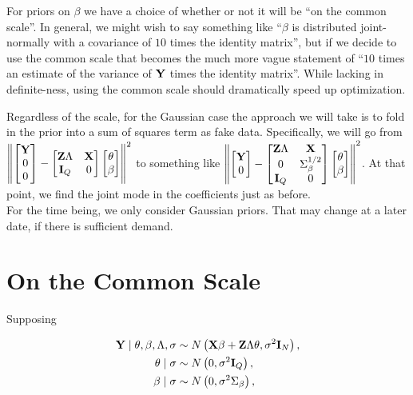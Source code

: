 \documentclass[10pt]{article}
\begin{document}
For priors on $\beta$ we have a choice of whether or not it will be
``on the common scale''. In general, we might wish to say something
like ``$\beta$ is distributed joint-normally with a covariance of $10$
times the identity matrix'', but if we decide to use the common scale
that becomes the much more vague statement of ``$10$ times an estimate
of the variance of ${\bf Y}$ times the identity matrix''. While
lacking in definite-ness, using the common scale should dramatically
speed up optimization.

Regardless of the scale, for the Gaussian case the approach we will take
is to fold in the prior into a sum of squares term as fake
data. Specifically, we will go from
$\left\| \begin{bmatrix}{\bf Y} \\ 0 \\ 0\end{bmatrix}
-\begin{bmatrix} {\bf Z}\Lambda & {\bf X} \\ {\bf I}_Q &
  0\end{bmatrix} \begin{bmatrix}\theta \\ \beta\end{bmatrix}
\right\|^2$ to something like 
$\left\| \begin{bmatrix}{\bf Y} \\ 0\end{bmatrix}
-\begin{bmatrix} {\bf Z}\Lambda & {\bf X} \\ 0 & \Sigma_\beta^{1/2} \\
  {\bf I}_Q &
  0\end{bmatrix} \begin{bmatrix}\theta \\ \beta\end{bmatrix}
\right\|^2$. At that point, we find the joint mode in the coefficients
just as before. \\

For the time being, we only consider Gaussian priors. That may change
at a later date, if there is sufficient demand.

\section*{On the Common Scale}

Supposing

\begin{align*}
{\bf Y} \mid \theta, \beta, \Lambda, \sigma &
\sim
N\left({\bf X}\beta + {\bf Z}\Lambda\theta, \sigma^2{\bf I}_N\right),
\\
\theta \mid \sigma & \sim N\left(0,
  \sigma^2{\bf I}_Q\right), \\
\beta \mid \sigma & \sim N\left(0,
  \sigma^2\Sigma_\beta\right),
\end{align*}
\end{document}
